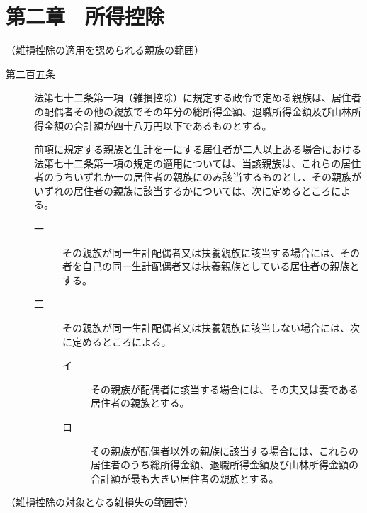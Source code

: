 \documentclass[twocolumn,a4j,10pt]{ltjtarticle}
\begin{document}
\section*{第二章　所得控除}
\noindent\hspace{10pt}（雑損控除の適用を認められる親族の範囲）
\begin{description}
\item[第二百五条]法第七十二条第一項（雑損控除）に規定する政令で定める親族は、居住者の配偶者その他の親族でその年分の総所得金額、退職所得金額及び山林所得金額の合計額が四十八万円以下であるものとする。
\item[]前項に規定する親族と生計を一にする居住者が二人以上ある場合における法第七十二条第一項の規定の適用については、当該親族は、これらの居住者のうちいずれか一の居住者の親族にのみ該当するものとし、その親族がいずれの居住者の親族に該当するかについては、次に定めるところによる。
\begin{description}
\item[一]その親族が同一生計配偶者又は扶養親族に該当する場合には、その者を自己の同一生計配偶者又は扶養親族としている居住者の親族とする。
\item[二]その親族が同一生計配偶者又は扶養親族に該当しない場合には、次に定めるところによる。
\begin{description}
\item[イ]その親族が配偶者に該当する場合には、その夫又は妻である居住者の親族とする。
\item[ロ]その親族が配偶者以外の親族に該当する場合には、これらの居住者のうち総所得金額、退職所得金額及び山林所得金額の合計額が最も大きい居住者の親族とする。
\end{description}
\end{description}
\end{description}
\noindent\hspace{10pt}（雑損控除の対象となる雑損失の範囲等）
\end{document}
